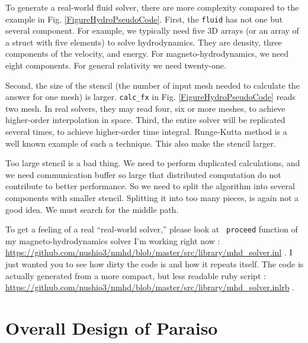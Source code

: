 \documentclass[twocolumn]{article}
\begin{document}
To generate a real-world fluid solver, there are more complexity compared to
the example in Fig. \ref{FigureHydroPseudoCode}. First, the {\tt fluid} has
not one but several component. For example, we typically need five 3D arrays
(or an array of a struct with five elements) to solve hydrodynamics. They are
density, three components of the velocity, and energy. For
magneto-hydrodynamics, we need eight components. For general relativity we
need twenty-one.

Second, the size of the stencil (the number of input mesh needed to calculate
the answer for one mesh) is larger. {\tt calc\_fx} in
Fig. \ref{FigureHydroPseudoCode} reads two mesh. In real solvers, they may
read four, six or more meshes, to achieve higher-order interpolation in space.
Third, the entire solver will be replicated several times, to achieve
higher-order time integral. Runge-Kutta method is a well known example of such
a technique. This also make the stencil larger.

Too large stencil is a bad thing. We need to perform duplicated calculations,
and we need communication buffer so large that distributed computation do not
contribute to better performance. So we need to split the algorithm into
several components with smaller stencil. Splitting it into too many pieces, is
again not a good idea. We must search for the middle path.

To get a feeling of a real ``real-world solver,'' please look at {\tt
  proceed} function of my magneto-hydrodynamics solver I'm working
right now :
\url{https://github.com/nushio3/nmhd/blob/master/src/library/mhd_solver.inl}
. I just wanted you to see how dirty the code is and how it repeats
itself. The code is actually generated from a more compact, but less
readable ruby script :
\url{https://github.com/nushio3/nmhd/blob/master/src/library/mhd_solver.inlrb}
.



\section{Overall Design of Paraiso}
\end{document}
